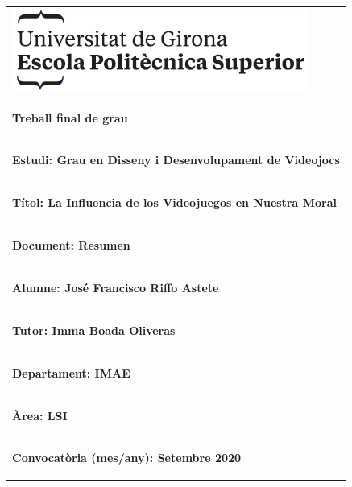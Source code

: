 \documentclass[12pt]{article}
\begin{document}
\pagestyle{empty}
\begin{tabular}{|p{\textwidth}|}
    \hline
    \vspace{.5mm}
    \includegraphics[scale=.7]{imgs/udg.png}\\
    \bigskip
    \begin{center}
        \begin{Huge} \textbf{Treball final de grau} \end{Huge}
    \end{center}\\
    \hline
    \vspace{1mm}
    \begin{large} \textbf{Estudi: Grau en Disseny i Desenvolupament de Videojocs} \end{large}
    \vspace{5mm}\\
    \hline
    \vspace{1mm}
    \begin{large} \textbf{Títol: La Influencia de los Videojuegos en Nuestra Moral} \end{large}
    \vspace{5mm}\\
    \hline
    \vspace{1mm}
    \begin{large} \textbf{Document: Resumen} \end{large}
    \vspace{5mm}\\
    \hline
    \vspace{1mm}
    \begin{large} \textbf{Alumne: José Francisco Riffo Astete} \end{large}
    \vspace{5mm}\\
    \hline
    \vspace{1mm}
    \begin{large} \textbf{Tutor: Imma Boada Oliveras} \end{large}\\
    \begin{large} \textbf{Departament: IMAE} \end{large}\\
    \begin{large} \textbf{Àrea: LSI} \end{large}\\[5mm]
    \hline
    \vspace{1mm}
    \begin{large} \textbf{Convocatòria (mes/any): Setembre 2020} \end{large}
    \vspace{5mm}\\
    \hline
\end{tabular}
\end{document}
